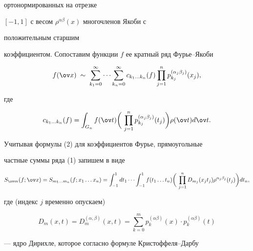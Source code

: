 ортонормированных на отрезке 


$[-1,1]$ с весом $\rho^{\alpha\beta}(x)$ многочленов Якоби с 


положительным старшим 


коэффициентом. Сопоставим функции $f$ ее кратный ряд Фурье--Якоби 


\begin{equation} 


f(\ov x)\;\sim\;\sum^\infty_{k_1=0}\dotsb 


\sum^\infty_{k_n=0}c_{k_1\dotsc k_n}(f) 


\prod^n_{j=1}p^{(\alpha_j\beta_j)}_{k_j}(x_j), 


\end{equation} 


где 


\begin{equation} 


c_{k_1\dotsc k_n}(f)=\int_{G_n}f(\ov t)\bigg(\, 


\prod^n_{j=1}p^{(\alpha_j\beta_j)}_{k_j}(t_j)\bigg) 


\rho(\ov t)d\ov t. 


\end{equation} 


Учитывая формулы (2) для коэффициентов Фурье, прямоугольные 


частные суммы ряда (1) запишем в виде 


\begin{equation} 


S_{\ov m}(f;\ov x)=S_{m_1\dotsc m_n}(f;x_1\dotsc x_n)= 


\int^1_{-1}dt_1\dotsb\int^1_{-1}f(t_1\dotsc t_n)\bigg(\, 


\prod^n_{j=1}D_{m_j}(x_j t_j) 


\rho^{\alpha_j\beta_j}(t_j)\bigg)dt_n, 


\end{equation} 


где (индекс $j$ временно опускаем) 


\begin{equation} 


D_m(x,t)=D^{(\alpha,\beta)}_m(x,t)= 


\sum^m_{k=0}p^{(\alpha\beta)}_k(x)\cdot 


p^{(\alpha\beta)}_k(t) 


\end{equation} 


--- ядро Дирихле, которое согласно формуле Кристоффеля--Дарбу 


